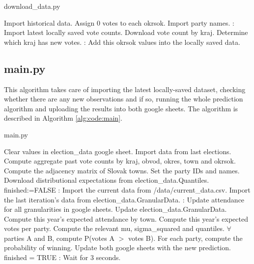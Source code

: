 \documentclass[12pt]{article}
\begin{document}
\begin{algorithm}
	\caption{download\_data.py}\label{alg:code:download_data}
	\begin{algorithmic}[1]
		\State Import historical data.
		\State Assign 0 votes to each okrsok.
		\State Import party names.
		:
			\State Import latest locally saved vote counts.
			\State Download vote count by kraj.
			\State Determine which kraj has new votes.
			:
									\State Add this okrsok values into the locally saved data.
								\EndFor
							\EndFor
						\EndFor
					\EndFor
				\EndFor				
			\EndIf
		\EndWhile
	\end{algorithmic}
\end{algorithm}


\subsection{main.py}
This algorithm takes care of importing the latest locally-saved dataset, checking whether there are any new observations and if so, running the whole prediction algorithm and uploading the results into both google sheets.
The algorithm is described in Algorithm \ref{alg:code:main}.


\begin{algorithm}
	\caption{main.py}\label{alg:code:main}
	\begin{algorithmic}[1]
		\State Clear values in election\_data google sheet.
		\State Import data from last elections.
		\State Compute aggregate past vote counts by kraj, obvod, okres, town and okrsok.
		\State Compute the adjacency matrix of Slovak towns.
		\State Set the party IDs and names.
		\State Download distributional expectations from election\_data.Quantiles.
		\State finished:=FALSE
		:
			\State Import the current data from /data/current\_data.csv.
			\State Import the last iteration's data from election\_data.GranularData.
			:
				\State Update attendance for all granularities in google sheets.
				\State Update election\_data.GranularData.
				\State Compute this year's expected attendance by town.
				\State Compute this year's expected votes per party.
				\State Compute the relevant mu, sigma\_squared and quantiles.
				\State $\forall$ parties A and B, compute P(votes A $>$ votes B).
				\State For each party, compute the probability of winning.
				\State Update both google sheets with the new prediction.
					\State finished = TRUE
				\EndIf
			\Else:
				\State Wait for 3 seconds.
			\EndIf
		\EndWhile
	\end{algorithmic}
\end{algorithm}
\end{document}
